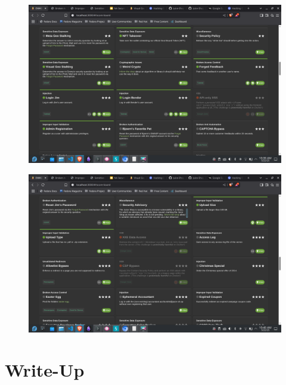 \documentclass[12pt]{article}
\begin{document}
\begin{figure}[H]
    \centering
    \includegraphics[width=1.0\linewidth]{images/image copy 3.png}
\end{figure}
\begin{figure}[H]
    \centering
    \includegraphics[width=1.0\linewidth]{images/image copy 4.png}
\end{figure}
\section{Write-Up}
\end{document}
